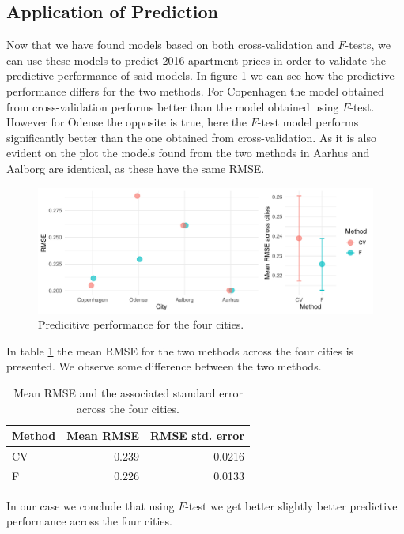 \subsection{Application of Prediction}\label{subsec:app_of_prediction}
Now that we have found models based on both cross-validation and $F$-tests, we can use these models to predict 2016 apartment prices in order to validate the predictive performance of said models.
In figure \ref{fig:predictive_performance} we can see how the predictive performance differs for the two methods.
For Copenhagen the model obtained from cross-validation performs better than the model obtained using $F$-test.
However for Odense the opposite is true, here the $F$-test model performs significantly better than the one obtained from cross-validation.
As it is also evident on the plot the models found from the two methods in Aarhus and Aalborg are identical, as these have the same RMSE.
\begin{figure}[H]
    \centering
    \includegraphics[width = .9\textwidth]{figures/Data_introduction/predictive_performance.pdf}
    \caption{Predicitive performance for the four cities.}
    \label{fig:predictive_performance}
\end{figure}
In table \ref{tbl:predictive_performance} the mean RMSE for the two methods across the four cities is presented.
We observe some difference between the two methods.
\begin{table}[H]
    \centering
    \begin{tabular}{lrr}
        \toprule
        \textbf{Method} & \textbf{Mean RMSE} & \textbf{RMSE std.$\!$ error}\\
        \midrule
        CV & 0.239 & 0.0216\\
        F & 0.226 & 0.0133\\
        \bottomrule
    \end{tabular}
    \caption{Mean RMSE and the associated standard error across the four cities.}
    \label{tbl:predictive_performance}
\end{table}
In our case we conclude that using $F$-test we get better slightly better predictive performance across the four cities.

